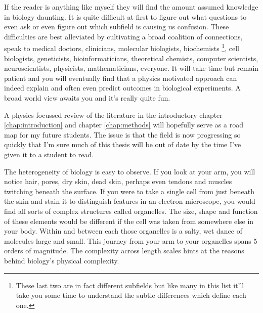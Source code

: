 If the reader is anything like myself they will find the amount assumed knowledge in biology daunting. It is quite difficult at first to figure out what questions to even ask or even figure out which subfield is causing us confusion. These difficulties are best alleviated by cultivating a broad coalition of connections, speak to medical doctors, clinicians, molecular biologists, biochemists \footnote{These last two are in fact different subfields but like many in this list it'll take you some time to understand the subtle differences which define each one.}, cell biologists, geneticists, bioinformaticians, theoretical chemists, computer scientists, neuroscientists, physicists, mathematicians, everyone. It will take time but remain patient and you will eventually find that a physics motivated approach can indeed explain and often even predict outcomes in biological experiments. A broad world view awaits you and it's really quite fun. 

A physics focussed review of the literature in the introductory chapter \ref{chap:introduction} and chapter \ref{chap:methods} will hopefully serve as a road map for my future students. The issue is that the field is now progressing so quickly that I'm sure much of this thesis will be out of date by the time I've given it to a student to read. 

The heterogeneity of biology is easy to observe. If you look at your arm, you will notice hair, pores, dry skin, dead skin, perhaps even tendons and muscles twitching beneath the surface. If you were to take a single cell from just beneath the skin and stain it to distinguish features in an electron microscope, you would find all sorts of complex structures called organelles. The size, shape and function of these elements would be different if the cell was taken from somewhere else in your body. Within and between each those organelles is a salty, wet dance of molecules large and small. This journey from your arm to your organelles spans 5 orders of magnitude. The complexity across length scales hints at the reasons behind biology's physical complexity. 


